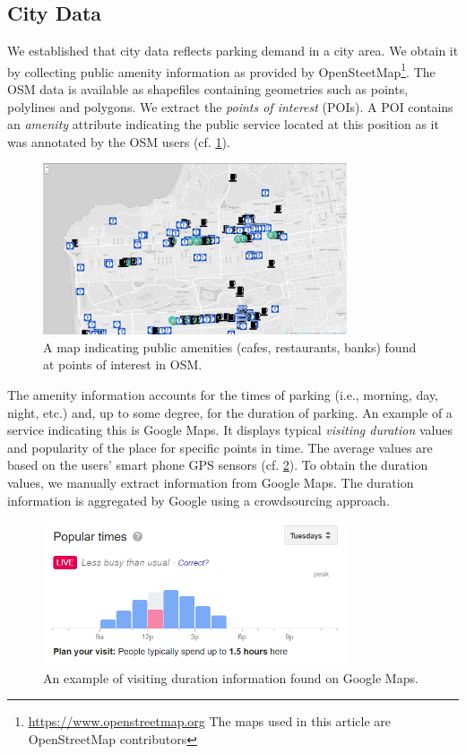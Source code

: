 \subsection{City Data}
\label{sec:citydata}
We established that city data reflects parking demand in a city area. We obtain it by collecting public amenity information as provided by OpenSteetMap\footnote{\url{https://www.openstreetmap.org} The maps used in this article are \textcopyright OpenStreetMap contributors}. The OSM data is available as shapefiles containing geometries such as points, polylines and polygons. We extract the \textit{points of interest} (POIs). A POI contains an \textit{amenity} attribute indicating the public service located at this position as it was annotated by the OSM users (cf. \ref{fig:pois}).

\begin{figure}[!ht]
	\centering
	\includegraphics[width=0.8\textwidth]{graphics/cafes_restaurants_banks_larger.png}
	\caption{A map indicating public amenities (cafes, restaurants, banks) found at points of interest in OSM.}
	\label{fig:pois}
\end{figure}

The amenity information accounts for the times of parking (i.e., morning, day, night, etc.) and, up to some degree, for the duration of parking. An example of a service indicating this is Google Maps.
It displays typical \textit{visiting duration} values and popularity of the place for specific points in time. The average values are based on the users' smart phone GPS sensors (cf. \ref{fig:visit_duration}). To obtain the duration values, we manually extract information from Google Maps. The duration information is aggregated by Google using a crowdsourcing approach. 

\begin{figure}[!ht]
	\centering
	\includegraphics[width=0.8\textwidth]{graphics/google_visit_duration.png}
	\caption{An example of visiting duration information found on Google Maps.}
	\label{fig:visit_duration}
\end{figure}

